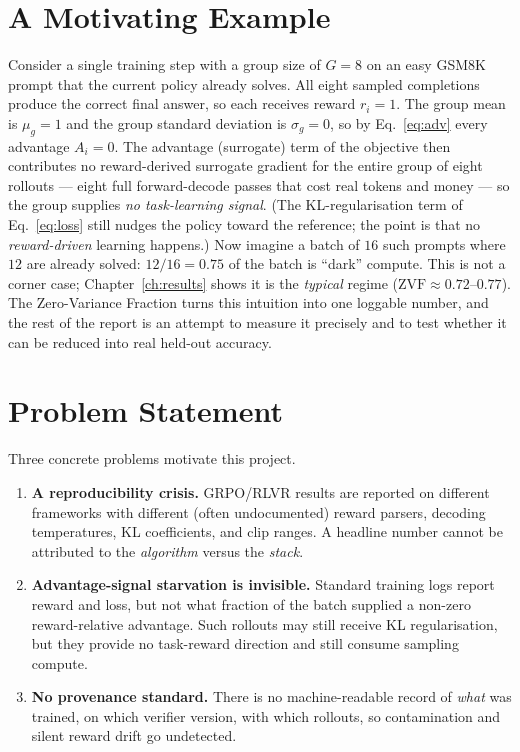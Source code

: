\documentclass[12pt,a4paper]{report}
\newcommand{\zvf}{\mathrm{ZVF}}
\begin{document}
\section{A Motivating Example}
Consider a single training step with a group size of $G=8$ on an easy GSM8K prompt
that the current policy already solves. All eight sampled completions produce the
correct final answer, so each receives reward $r_i=1$. The group mean is $\mu_g=1$
and the group standard deviation is $\sigma_g=0$, so by Eq.~\eqref{eq:adv} every
advantage $A_i=0$. The advantage (surrogate) term of the objective then contributes
no reward-derived surrogate gradient for the entire group of eight rollouts --- eight full forward-decode
passes that cost real tokens and money --- so the group supplies \emph{no
task-learning signal}. (The KL-regularisation term of Eq.~\eqref{eq:loss} still nudges
the policy toward the reference; the point is that no \emph{reward-driven} learning
happens.)
Now imagine a batch of $16$ such prompts where $12$ are already solved: $12/16=0.75$
of the batch is ``dark'' compute. This is not a corner case; Chapter~\ref{ch:results}
shows it is the \emph{typical} regime ($\zvf\approx0.72$--$0.77$). The Zero-Variance
Fraction turns this intuition into one loggable number, and the rest of the report is
an attempt to measure it precisely and to test whether it can be reduced into real
held-out accuracy.

\section{Problem Statement}
Three concrete problems motivate this project.
\begin{enumerate}[leftmargin=1.6em,itemsep=3pt]
  \item \textbf{A reproducibility crisis.} GRPO/RLVR results are reported on
  different frameworks with different (often undocumented) reward parsers, decoding
  temperatures, KL coefficients, and clip ranges. A headline number cannot be
  attributed to the \emph{algorithm} versus the \emph{stack}.
  \item \textbf{Advantage-signal starvation is invisible.} Standard training logs
  report reward and loss, but not what fraction of the batch supplied a non-zero
  reward-relative advantage. Such rollouts may still receive KL regularisation, but
  they provide no task-reward direction and still consume sampling compute.
  \item \textbf{No provenance standard.} There is no machine-readable record of
  \emph{what} was trained, on which verifier version, with which rollouts, so
  contamination and silent reward drift go undetected.
\end{enumerate}
\end{document}
